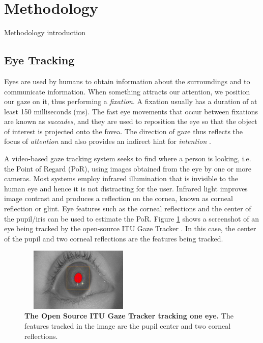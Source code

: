 \documentclass[]{article}
\begin{document}
\section{Methodology}
Methodology introduction

\subsection{Eye Tracking}
Eyes are used by humans to obtain information about the surroundings and to
communicate information. When something attracts our attention, we position our
gaze on it, thus performing a \textit{fixation}. A fixation usually has a
duration of at least 150 milliseconds (ms). The fast eye movements that
occur between fixations are known as \textit{saccades}, and they are used to
reposition the eye so that the object of interest is projected onto the fovea.
The direction of gaze thus reflects the focus of 
\textit{attention} and also provides an indirect hint for \textit{intention}
\cite{velichkovsky}.


A video-based gaze tracking system seeks to find where a person is looking, i.e.
the Point of Regard (PoR), using images obtained from the eye by one
or more cameras. Most systems employ infrared
illumination that is invisible to the human eye and hence it is not distracting
for the user. Infrared light improves image contrast and produces a reflection
on the cornea, known as corneal reflection or glint. Eye features such as the
corneal reflections and the center of the pupil/iris can be used to estimate the
PoR. Figure \ref{screenGazeTracker} shows a screenshot of an eye being tracked
by the open-source ITU Gaze Tracker \cite{lowcostitugazetracker}. In this case,
the center of the pupil and two corneal reflections are the features being
tracked.


\begin{figure}[ht]
\begin{center}
\includegraphics[width=0.5\textwidth, height=30mm]{figures/screenGazeTracker.jpg}
\vspace{-3mm}
\end{center}
\caption{\textbf{The Open Source ITU Gaze Tracker tracking one eye.} The
features tracked in the image are the pupil center and two corneal reflections.}
\label{screenGazeTracker}
\end{figure}
\end{document}
